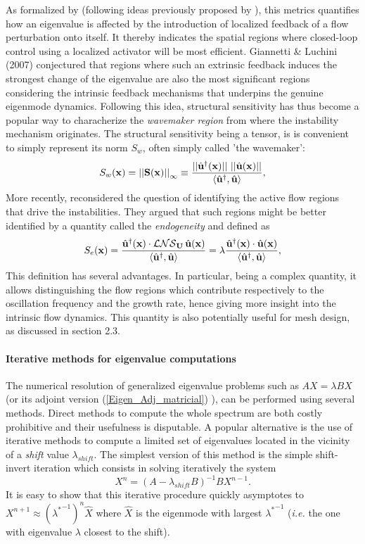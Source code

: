 \documentclass[twocolumn,10pt]{asme2ej}
\newcommand{\be}[1]{ \begin{equation} \label{#1}}
\newcommand{\ee}{\end{equation}}
\begin{document}
As formalized by \cite{GiannettiLuchini} (following ideas previously proposed by \cite{hill1992theoretical}), this metrics quantifies how an eigenvalue is affected by the introduction of localized feedback of a flow perturbation onto itself. It thereby indicates the spatial regions where closed-loop control using a localized activator will be most efficient. Giannetti \& Luchini (2007) conjectured that regions where such an extrinsic feedback induces the strongest change of the eigenvalue are also the most significant regions considering the intrinsic feedback mechanisms that underpins the genuine eigenmode dynamics. Following this idea, structural sensitivity has thus become a popular way to characherize the  {\em wavemaker region} from where the instability mechanism originates. The structural sensitivity being a tensor, is is convenient to simply represent its norm $S_w$, often simply called 'the wavemaker': 
\be{Structursens} 
S_w({\bf x}) =  {||{\bf{S}}({\bf{x}})||}_\infty \equiv \frac{ ||\hat{\bf u}^\dag({\bf x})|| \,\, ||\hat{\bf u}({\bf x})|| }{{\left<\hat{\bf u}^\dag, \hat{\bf u}\right>}},
\ee 
More recently, \cite{marquet2015endogeneity} reconsidered the question of identifying the active flow regions that drive the instabilities. They argued that such regions might be better identified by a quantity called the {\em endogeneity} and defined as  
\be{Endo} 
S_e({\bf x}) =  \frac{  \hat{\bf u}^\dag({\bf x}) \cdot  {\cal LNS}_{\bf U} \, \hat{\bf u}({\bf x})  }{{\left<\hat{\bf u}^\dag, \hat{\bf u}\right>}}  
= \lambda \frac{ \hat{\bf u}^\dag({\bf x}) \cdot \hat{\bf u}({\bf x}) }{{\left<\hat{\bf u}^\dag, \hat{\bf u}\right>}},
\ee 
This definition has several advantages. In particular, being a complex quantity, it allows distinguishing the flow regions which contribute respectively to the oscillation frequency and the growth rate, hence giving more insight into the intrinsic flow dynamics. This quantity is also potentially useful for mesh design, as discussed in section 2.3.


\paragraph{Iterative methods for eigenvalue computations}

The numerical resolution of generalized eigenvalue problems such as $A X = \lambda B X$ (or its adjoint version (\ref{Eigen_Adj_matricial}) ), 
can be performed using several methods. Direct methods to compute the whole spectrum are both costly prohibitive and their usefulness is disputable. A popular alternative is the use of iterative methods to compute a limited set of eigenvalues located in the vicinity of a 
{\em shift} value $\lambda_{shift}$. The simplest version of this method is the simple shift-invert iteration which consists in solving iteratively the system
$$
X^{n} =  (A- \lambda_{shift} B)^{-1} B X^{n-1}.
$$ 
It is easy to show that this iterative procedure quickly asymptotes to $X^{n+1} \approx ({\lambda^*}^{-1})^n \hat{X}$
where $\hat{X}$ is the eigenmode with largest ${\lambda^*}^{-1}$ (\textit{i.e.} the one with eigenvalue $\lambda$ closest to the shift). 
\end{document}
